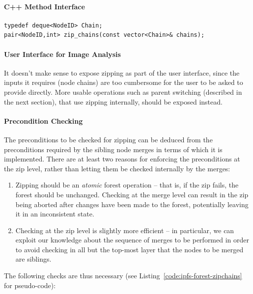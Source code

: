 \paragraph{C++ Method Interface}

\begin{lstlisting}[style=Prototype]
typedef deque<NodeID> Chain;
pair<NodeID,int> zip_chains(const vector<Chain>& chains);
\end{lstlisting}

\paragraph{User Interface for Image Analysis}

It doesn't make sense to expose zipping as part of the user interface, since the inputs it requires (node chains) are too cumbersome for the user to be asked to provide directly. More usable operations such as parent switching (described in the next section), that use zipping internally, should be exposed instead.

\paragraph{Precondition Checking}

The preconditions to be checked for zipping can be deduced from the preconditions required by the sibling node merges in terms of which it is implemented. There are at least two reasons for enforcing the preconditions at the zip level, rather than letting them be checked internally by the merges:

\begin{enumerate}

\item Zipping should be an \emph{atomic} forest operation -- that is, if the zip fails, the forest should be unchanged. Checking at the merge level can result in the zip being aborted after changes have been made to the forest, potentially leaving it in an inconsistent state.

\item Checking at the zip level is slightly more efficient -- in particular, we can exploit our knowledge about the sequence of merges to be performed in order to avoid checking in all but the top-most layer that the nodes to be merged are siblings.

\end{enumerate}

\noindent The following checks are thus necessary (see Listing~\ref{code:ipfs-forest-zipchains} for pseudo-code):

